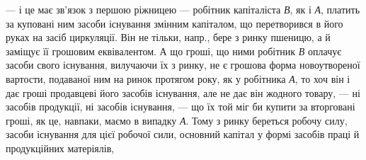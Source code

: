  — і це має зв’язок з першою ріжницею — робітник капіталіста
\emph{В}, як і \emph{А}, платить за куповані ним засоби існування змінним
капіталом, що перетворився в його руках на засіб циркуляції. Він не
тільки, напр., бере з ринку пшеницю, а й заміщує її грошовим еквівалентом.
А що гроші, що ними робітник \emph{В} оплачує засоби свого існування,
вилучаючи їх з ринку, не є грошова форма новоутвореної вартости,
подаваної ним на ринок протягом року, як у робітника \emph{А}, то хоч
він і дає гроші продавцеві його засобів існування, але не дає він жодного
товару, — ні засобів продукції, ні засобів існування, — що їх той
міг би купити за вторговані гроші, як це, навпаки, маємо в випадку \emph{А}.
Тому з ринку береться робочу силу, засоби існування для цієї робочої
сили, основний капітал у формі засобів праці й продукційних матеріялів,
\parbreak{}  %
